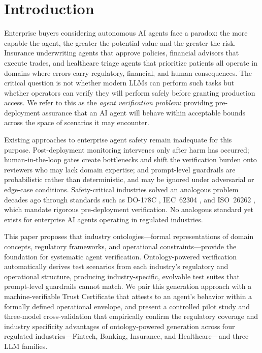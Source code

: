 \documentclass[11pt,a4paper]{article}
\begin{document}
\section{Introduction}
\label{sec:introduction}

Enterprise buyers considering autonomous AI agents face a paradox: the
more capable the agent, the greater the potential value and the
greater the risk. Insurance underwriting agents that approve policies,
financial advisors that execute trades, and healthcare triage agents
that prioritize patients all operate in domains where errors carry
regulatory, financial, and human consequences. The critical question
is not whether modern LLMs can perform such tasks but whether
operators can verify they will perform safely before granting
production access. We refer to this as the \emph{agent verification
problem}: providing pre-deployment assurance that an AI agent will
behave within acceptable bounds across the space of scenarios it may
encounter.

Existing approaches to enterprise agent safety remain inadequate for
this purpose. Post-deployment monitoring \citep{amodei2016concrete}
intervenes only after harm has occurred; human-in-the-loop gates
\citep{christiano2017deep} create bottlenecks and shift the
verification burden onto reviewers who may lack domain expertise; and
prompt-level guardrails \citep{bai2022constitutional} are
probabilistic rather than deterministic, and may be ignored under
adversarial or edge-case conditions. Safety-critical industries
solved an analogous problem decades ago through standards such as
DO-178C \citep{rierson2017developing}, IEC~62304 \citep{iec62304},
and ISO~26262 \citep{iso26262}, which mandate rigorous pre-deployment
verification. No analogous standard yet exists for enterprise AI
agents operating in regulated industries.

This paper proposes that industry ontologies---formal representations
of domain concepts, regulatory frameworks, and operational
constraints---provide the foundation for systematic agent
verification. Ontology-powered verification automatically derives
test scenarios from each industry's regulatory and operational
structure, producing industry-specific, evolvable test suites that
prompt-level guardrails cannot match. We pair this
generation approach with a machine-verifiable Trust Certificate that
attests to an agent's behavior within a formally defined operational
envelope, and present a controlled pilot study and three-model
cross-validation that empirically confirm the regulatory coverage and
industry specificity advantages of ontology-powered generation across
four regulated industries---Fintech, Banking, Insurance, and
Healthcare---and three LLM families.
\end{document}
